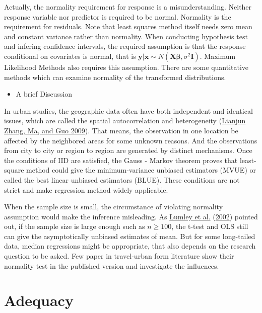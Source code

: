 \documentclass[
  11pt,
  openany]{memoir}
\providecommand{\tightlist}{%
  \setlength{\itemsep}{0pt}\setlength{\parskip}{0pt}}
\begin{document}
Actually, the normality requirement for response is a misunderstanding. Neither response variable nor predictor is required to be normal.
Normality is the requirement for residuals.
Note that least squares method itself needs zero mean and constant variance rather than normality.
When conducting hypothesis test and infering confidence intervals, the required assumption is that the response conditional on covariates is normal, that is \(\mathbf{y|x}\sim N (\mathbf{X}\boldsymbol{\beta},\sigma^2\mathbf{I})\). Maximum Likelihood Methods also requires this assumption.
There are some quantitative methods which can examine normality of the transformed distributions.

\begin{itemize}
\tightlist
\item
  A brief Discussion
\end{itemize}

In urban studies, the geographic data often have both independent and identical issues, which are called the spatial autocorrelation and heterogeneity (\protect\hyperlink{ref-zhangEvaluationSpatialAutocorrelation2009}{Lianjun Zhang, Ma, and Guo 2009}).
That means, the observation in one location be affected by the neighbored areas for some unknown reasons. And the observations from city to city or region to region are generated by distinct mechanisms.
Once the conditions of IID are satisfied, the Gauss - Markov theorem proves that least-square method could give the minimum-variance unbiased estimators (MVUE) or called the best linear unbiased estimators (BLUE). These conditions are not strict and make regression method widely applicable.

When the sample size is small, the circumstance of violating normality assumption would make the inference misleading.
As \protect\hyperlink{ref-lumleyImportanceNormalityAssumption2002}{Lumley et al.} (\protect\hyperlink{ref-lumleyImportanceNormalityAssumption2002}{2002}) pointed out, if the sample size is large enough such as \(n\ge 100\), the t-test and OLS still can give the asymptotically unbiased estimates of mean. But for some long-tailed data, median regressions might be appropriate, that also depends on the research question to be asked.
Few paper in travel-urban form literature show their normality test in the published version and investigate the influences.

\hypertarget{adequacy}{%
\section{Adequacy}\label{adequacy}}
\end{document}
